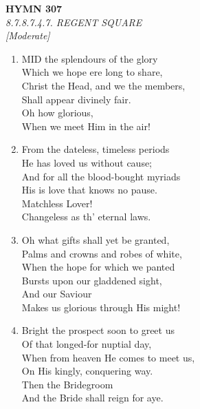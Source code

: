 \documentclass[11pt,a4paper]{article}
\begin{document}
\newpage
\begin{center}
    {\Large \textbf{HYMN 307}}
    \\
    \textit{8.7.8.7.4.7. REGENT SQUARE}
    \\
    \textit{\small [Moderate]}
\end{center}
\vspace{1em}

\begin{enumerate}
    \item MID the splendours of the glory \\
        Which we hope ere long to share, \\
        Christ the Head, and we the members, \\
        Shall appear divinely fair. \\
        Oh how glorious, \\
        When we meet Him in the air!

    \item From the dateless, timeless periods \\
        He has loved us without cause; \\
        And for all the blood-bought myriads \\
        His is love that knows no pause. \\
        Matchless Lover! \\
        Changeless as th' eternal laws.

    \item Oh what gifts shall yet be granted, \\
        Palms and crowns and robes of white, \\
        When the hope for which we panted \\
        Bursts upon our gladdened sight, \\
        And our Saviour \\
        Makes us glorious through His might!

    \item Bright the prospect soon to greet us \\
        Of that longed-for nuptial day, \\
        When from heaven He comes to meet us, \\
        On His kingly, conquering way. \\
        Then the Bridegroom \\
        And the Bride shall reign for aye.

\end{enumerate}
\end{document}
